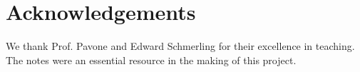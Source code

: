 \section{Acknowledgements}
We thank Prof. Pavone and Edward Schmerling for their excellence in teaching. The notes were an essential resource in the making of this project.
